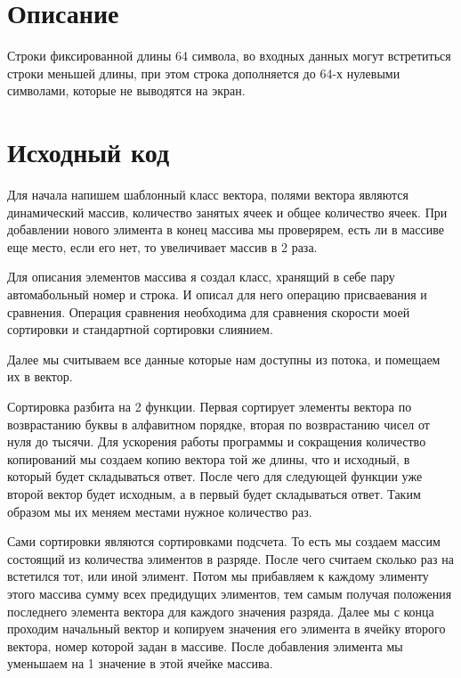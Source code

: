 \section{Описание}
Строки фиксированной длины 64 символа, во входных данных могут встретиться строки меньшей длины, при этом строка дополняется до 64-х нулевыми символами, которые не выводятся на экран.

\pagebreak

\section{Исходный код}
Для начала напишем шаблонный класс вектора, полями вектора являются динамический массив, количество занятых ячеек и общее количество ячеек. При добавлении нового элимента в конец массива мы проверярем, есть ли в массиве еще место, если его нет, то увеличивает массив в 2 раза.


Для описания элементов массива я создал класс, хранящий в себе пару автомабольный номер и строка. И описал для него операцию присваевания и сравнения. Операция сравнения необходима для сравнения скорости моей сортировки и стандартной сортировки слиянием.


Далее мы считываем все данные которые нам доступны из потока, и помещаем их в вектор.


Сортировка разбита на 2 функции. Первая сортирует элементы вектора по возврастанию буквы в алфавитном порядке, вторая по возврастанию чисел от нуля до тысячи. Для ускорения работы программы и сокращения количество копирований мы создаем копию вектора той же длины, что и исходный, в который будет складываться ответ. После чего для следующей функции уже второй вектор будет исходным, а в первый будет складываться ответ. Таким образом мы их меняем местами нужное количество раз.


Сами сортировки являются сортировками подсчета. То есть мы создаем массим состоящий из количества элиментов в разряде. После чего считаем сколько раз на встетился тот, или иной элимент. Потом мы прибавляем к каждому элименту этого массива сумму всех предидущих элиментов, тем самым получая положения последнего элемента вектора для каждого значения разряда. Далее мы с конца проходим начальный вектор и копируем значения его элимента в ячейку второго вектора, номер которой задан в массиве. После добавления элимента мы уменьшаем на 1 значение в этой ячейке массива.

\pagebreak

